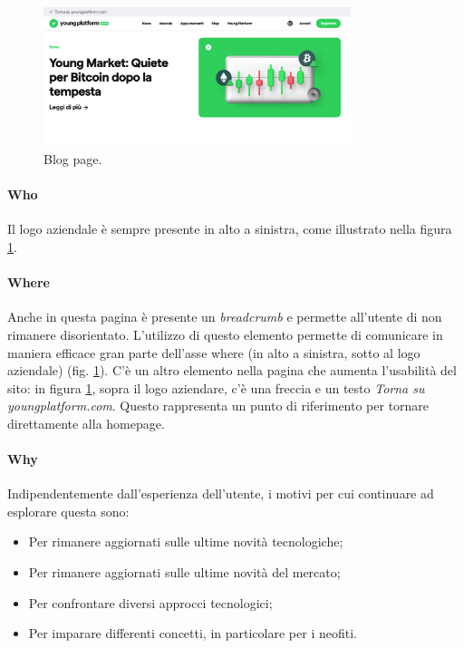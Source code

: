 \begin{figure}[H]
  \centering
  \includegraphics[width=0.80\textwidth]{res/images/internal-pages/blog/blog-1.png}
  \caption{Blog page.}
  \label{fig:blog-1}
\end{figure}

\paragraph{Who}

Il logo aziendale è sempre presente in alto a sinistra, come illustrato 
nella figura \ref{fig:blog-1}.

\paragraph{Where}

Anche in questa pagina è presente un \textit{breadcrumb} e permette 
all'utente di non rimanere disorientato. L'utilizzo di questo elemento 
permette di comunicare in maniera efficace gran parte dell'asse where 
(in alto a sinistra, sotto al logo aziendale) (fig. \ref{fig:blog-1}). 
C'è un altro elemento nella pagina che aumenta l'usabilità del sito: 
in figura \ref{fig:blog-1}, sopra il logo aziendare, c'è una freccia e 
un testo \textit{Torna su youngplatform.com}. Questo rappresenta un 
punto di riferimento per tornare direttamente alla homepage.

\paragraph{Why}

Indipendentemente dall'esperienza dell'utente, i motivi per cui continuare 
ad esplorare questa sono:
\begin{itemize}
  \item Per rimanere aggiornati sulle ultime novità tecnologiche;
  \item Per rimanere aggiornati sulle ultime novità del mercato;
  \item Per confrontare diversi approcci tecnologici;
  \item Per imparare differenti concetti, in particolare per i neofiti.
\end{itemize}

